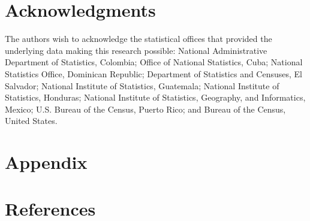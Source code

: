 \documentclass[
]{article}
\begin{document}
\newpage
\section*{Acknowledgments}

The authors wish to acknowledge the statistical offices that provided
the underlying data making this research possible: National
Administrative Department of Statistics, Colombia; Office of National
Statistics, Cuba; National Statistics Office, Dominican Republic;
Department of Statistics and Censuses, El Salvador; National Institute
of Statistics, Guatemala; National Institute of Statistics, Honduras;
National Institute of Statistics, Geography, and Informatics, Mexico;
U.S. Bureau of the Census, Puerto Rico; and Bureau of the Census, United
States.

\newpage
\section{Appendix}

\newpage

\section*{References}\label{references}
\end{document}
